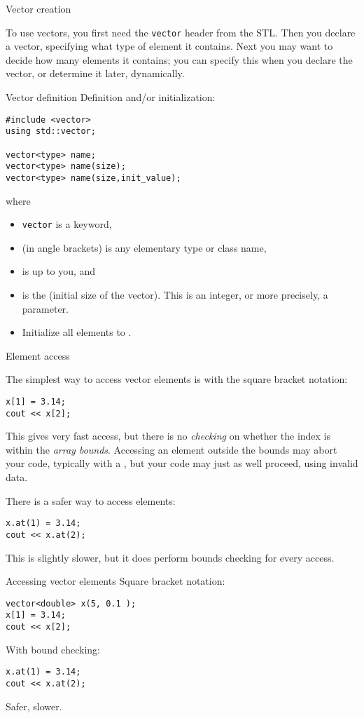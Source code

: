  {Vector creation}

To use vectors, you first need the \lstinline{vector} header from the
\ac{STL}. Then you declare a vector, specifying what type of element
it contains. Next you may want to decide how many elements it
contains; you can specify this when you declare the vector, or
determine it later, dynamically.

\begin{block}{Vector definition}
  \label{sl:vector-def}
  Definition and/or initialization:
\begin{lstlisting}
#include <vector>
using std::vector;

vector<type> name;
vector<type> name(size);
vector<type> name(size,init_value);
\end{lstlisting}
where
\begin{itemize}
\item \lstinline{vector} is a keyword,
\item {} (in angle brackets) is any elementary type or class
  name,
\item {} is up to you, and
\item {} is the (initial size of the vector). This is an integer,
  or more precisely, a  parameter.
\item Initialize all elements to .
\end{itemize}
\end{block}

 {Element access}

The simplest way to access vector elements is with the square bracket notation:
\begin{lstlisting}
x[1] = 3.14;
cout << x[2];
\end{lstlisting}
This gives very fast access, but there is no \emph{checking} on whether the
index is within the \emph{array
  bounds}. Accessing an element outside
the bounds may abort your code, typically with a
, but your code may just as well
proceed, using invalid data.

There is a safer way to access elements:
\begin{lstlisting}
x.at(1) = 3.14;
cout << x.at(2);  
\end{lstlisting}
This is slightly slower, but it does perform bounds checking for every access.

\begin{slide}{Accessing vector elements}
  \label{sl:vectorsub}
  Square bracket notation:
\begin{lstlisting}
vector<double> x(5, 0.1 );
x[1] = 3.14;
cout << x[2];
\end{lstlisting}
With bound checking:
\begin{lstlisting}
x.at(1) = 3.14;
cout << x.at(2);
\end{lstlisting}
Safer, slower.
\end{slide}

